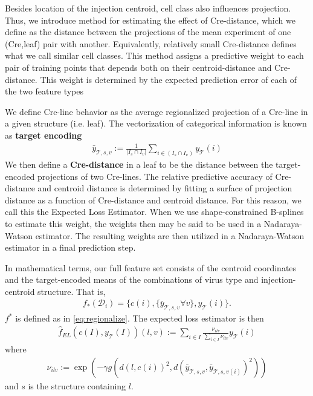 \label{supp_sec:el}

Besides location of the injection centroid, cell class also influences projection.
Thus, we introduce method for estimating the effect of Cre-distance, which we define as the distance between the projections of the mean experiment of one (Cre,leaf) pair with another.
Equivalently, relatively small Cre-distance defines what we call similar cell classes.
This method assigns a predictive weight to each pair of training points that depends both on their centroid-distance and Cre-distance.
This weight is determined by the expected prediction error of each of the two feature types

We define Cre-line behavior as the average regionalized projection of a Cre-line in a given structure (i.e. leaf).
The vectorization of categorical information is known as \textbf{target encoding} 
\begin{eqnarray*}
\bar y_{\mathcal T,s,v} := \frac{1}{|I_s \cap I_v|}  \sum_{i \in (I_s \cap I_v)} y_{\mathcal T}(i)
\end{eqnarray*}
We then define a \textbf{Cre-distance} in a leaf to be the distance between the target-encoded projections of two Cre-lines.
The relative predictive accuracy of Cre-distance and centroid distance is determined by fitting a surface of projection distance as a function of Cre-distance and centroid distance. 
For this reason, we call this the Expected Loss Estimator.
When we use shape-constrained B-splines to estimate this weight, the weights then may be said to be used in a Nadaraya-Watson estimator.
The resulting weights are then utilized in a Nadaraya-Watson estimator in a final prediction step.

In mathematical terms, our full feature set consists of the centroid coordinates and the target-encoded means of the combinations of virus type and injection-centroid structure.
That is, 
\begin{eqnarray*}
f_*({\mathcal D}_i) = \{c(i) , \{\bar y_{\mathcal T,s,v}  \forall v \}, y_{\mathcal T}(i) \}.
\end{eqnarray*}
$f^*$ is defined as in \eqref{eq:regionalize}.
The expected loss estimator is then 
\begin{eqnarray*}
\hat f_{EL} ( c(I),y_{\mathcal T} (I))(l,v) :=  \sum_{i \in I} \frac{ \nu_{ilv} }{\sum_{i \in I}  \nu_{ilv}  } y_{\mathcal T}(i)
\end{eqnarray*}
where
\begin{eqnarray*}
\nu_{ilv} := \exp (- \gamma g( d(l, c(i))^2, d(\bar y_{\mathcal T,s,v} , \bar y_{\mathcal T,s,v(i)}  )^2))
\end{eqnarray*}
and $s$ is the structure containing $l$.

